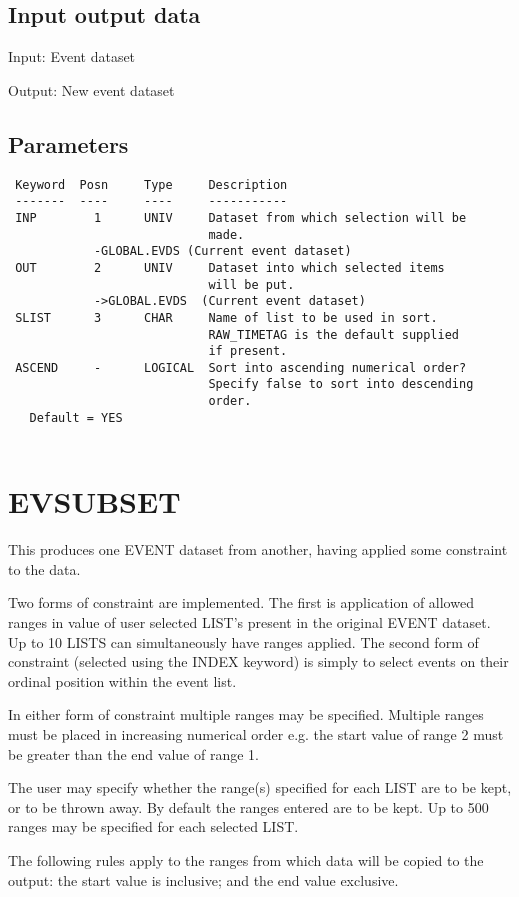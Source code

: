 \documentclass{book}
\renewcommand{\_}{{\tt\char'137}}     %
\begin{document}
\subsection{Input output data}
Input: Event dataset
 
Output: New event dataset
 
\subsection{Parameters}
\begin{verbatim}
 Keyword  Posn     Type     Description
 -------  ----     ----     -----------
 INP        1      UNIV     Dataset from which selection will be
                            made.
            -GLOBAL.EVDS (Current event dataset)
 OUT        2      UNIV     Dataset into which selected items
                            will be put.
            ->GLOBAL.EVDS  (Current event dataset)
 SLIST      3      CHAR     Name of list to be used in sort.
                            RAW_TIMETAG is the default supplied
                            if present.
 ASCEND     -      LOGICAL  Sort into ascending numerical order?
                            Specify false to sort into descending
                            order.
   Default = YES
 
\end{verbatim}\section{EVSUBSET}
This produces one EVENT dataset from another, having applied some
constraint to the data.
 
Two forms of constraint are implemented. The first is application
of allowed ranges in value of user selected LIST's present in the
original EVENT dataset. Up to 10 LISTS can simultaneously have
ranges applied. The second form of constraint (selected using the
INDEX keyword) is simply to select events on their ordinal position
within the event list.
 
In either form of constraint multiple ranges may be specified.
Multiple ranges must be placed in increasing numerical order e.g.
the start value of range 2 must be greater than the end value of
range 1. 
 
The user may specify whether the range(s) specified for each
LIST are to be kept, or to be thrown away. By default the
ranges entered are to be kept. Up to 500 ranges may be specified
for each selected LIST.
 
The following rules apply to the ranges from which data will be
copied to the output: the start value is inclusive; and the end
value exclusive.
 
\end{document}
